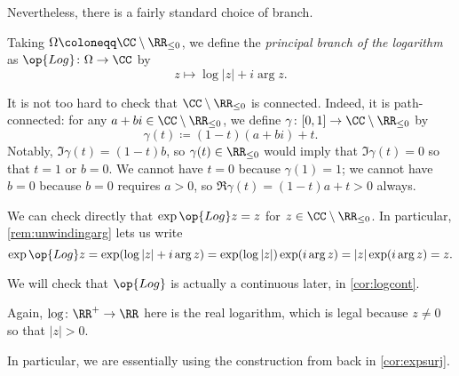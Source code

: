 Nevertheless, there is a fairly standard choice of branch.
\begin{defihelper} 
	Taking $\Omega\coloneqq \CC\setminus\RR_{\le0}$, we define the \textit{principal branch of the logarithm} as $\op{Log}\colon \Omega\to\CC$ by
	\[z\mapsto\log|z|+i\arg z.\]
\end{defihelper}
\begin{remark} \label{rem:checkconnected}
	It is not too hard to check that $\CC\setminus\RR_{\le0}$ is connected. Indeed, it is path-connected: for any $a+bi\in\CC\setminus\RR_{\le0}$, we define $\gamma\colon [0,1]\to\CC\setminus\RR_{\le0}$ by
	\[\gamma(t)\coloneqq (1-t)(a+bi)+t.\]
	Notably, $\Im\gamma(t)=(1-t)b$, so $\gamma(t)\in\RR_{\le0}$ would imply that $\Im\gamma(t)=0$ so that $t=1$ or $b=0$. We cannot have $t=0$ because $\gamma(1)=1$; we cannot have $b=0$ because $b=0$ requires $a>0$, so $\Re\gamma(t)=(1-t)a+t>0$ always.
\end{remark}
\begin{remark} \label{rem:checklogisinverse}
	We can check directly that $\exp\op{Log}z=z$ for $z\in\CC\setminus\RR_{\le0}$. In particular, \autoref{rem:unwindingarg} lets us write
	\[\exp\op{Log}z=\exp(\log|z|+i\arg z)=\exp(\log|z|)\exp(i\arg z)=|z|\exp(i\arg z)=z.\]
\end{remark}
We will check that $\op{Log}$ is actually a continuous later, in \autoref{cor:logcont}.
\begin{remark}
	Again, $\log\colon \RR^+\to\RR$ here is the real logarithm, which is legal because $z\ne0$ so that $|z|>0$.
\end{remark}
In particular, we are essentially using the construction from back in \autoref{cor:expsurj}.

